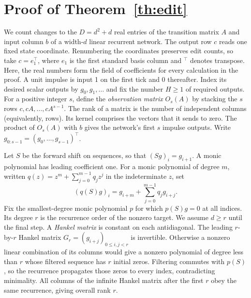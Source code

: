 \section{Proof of Theorem~\ref{th:edit}}\label{app:proof}
We count changes to the \(D=d^2+d\) real entries of the transition matrix \(A\) and input column \(b\) of a width-\(d\) linear recurrent network. The output row \(c\) reads one fixed state coordinate. Renumbering the coordinates preserves edit counts, so take \(c=e_1^\top\), where \(e_1\) is the first standard basis column and \({}^\top\) denotes transpose. Here, the real numbers form the field of coefficients for every calculation in the proof. A unit impulse is input 1 on the first tick and 0 thereafter. Index its desired scalar outputs by \(g_0,g_1,\ldots\) and fix the number \(H\ge1\) of required outputs. For a positive integer \(s\), define the \emph{observation matrix} \(O_s(A)\) by stacking the \(s\) rows \(c,cA,\ldots,cA^{s-1}\). The rank of a matrix is the number of independent columns (equivalently, rows). Its kernel comprises the vectors that it sends to zero. The product of \(O_s(A)\) with \(b\) gives the network's first \(s\) impulse outputs. Write \(g_{0:s-1}=(g_0,\ldots,g_{s-1})^\top\).

Let \(S\) be the forward shift on sequences, so that \((Sg)_i=g_{i+1}\). A monic polynomial has leading coefficient one. For a monic polynomial of degree \(m\), written \(q(z)=z^m+\sum_{j=0}^{m-1}q_jz^j\) in the indeterminate \(z\), set
\[
             (q(S)g)_i=g_{i+m}+\sum_{j=0}^{m-1}q_jg_{i+j}.
\]
Fix the smallest-degree monic polynomial \(p\) for which \(p(S)g=0\) at all indices. Its degree \(r\) is the recurrence order of the nonzero target. We assume \(d\ge r\) until the final step. A \emph{Hankel matrix} is constant on each antidiagonal. The leading \(r\)-by-\(r\) Hankel matrix \(G_r=(g_{i+j})_{0\le i,j<r}\) is invertible. Otherwise a nonzero linear combination of its columns would give a nonzero polynomial of degree less than \(r\) whose filtered sequence has \(r\) initial zeros. Filtering commutes with \(p(S)\), so the recurrence propagates those zeros to every index, contradicting minimality. All columns of the infinite Hankel matrix after the first \(r\) obey the same recurrence, giving overall rank \(r\).

